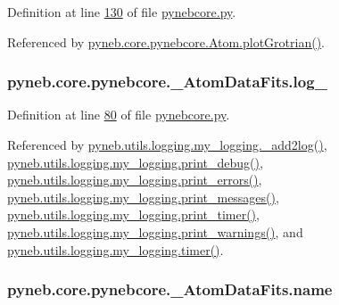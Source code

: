 Definition at line \hyperlink{pynebcore_8py_source_l00130}{130} of file \hyperlink{pynebcore_8py_source}{pynebcore.\+py}.



Referenced by \hyperlink{pynebcore_8py_source_l02372}{pyneb.\+core.\+pynebcore.\+Atom.\+plot\+Grotrian()}.

\hypertarget{classpyneb_1_1core_1_1pynebcore_1_1___atom_data_fits_a8919598e2830080299dcfe70249d4a15}{}
\subsubsection[{log\+\_\+}]{\setlength{\rightskip}{0pt plus 5cm}pyneb.\+core.\+pynebcore.\+\_\+\+Atom\+Data\+Fits.\+log\+\_\+}\label{classpyneb_1_1core_1_1pynebcore_1_1___atom_data_fits_a8919598e2830080299dcfe70249d4a15}


Definition at line \hyperlink{pynebcore_8py_source_l00080}{80} of file \hyperlink{pynebcore_8py_source}{pynebcore.\+py}.



Referenced by \hyperlink{logging_8py_source_l00059}{pyneb.\+utils.\+logging.\+my\+\_\+logging.\+\_\+add2log()}, \hyperlink{logging_8py_source_l00157}{pyneb.\+utils.\+logging.\+my\+\_\+logging.\+print\+\_\+debug()}, \hyperlink{logging_8py_source_l00149}{pyneb.\+utils.\+logging.\+my\+\_\+logging.\+print\+\_\+errors()}, \hyperlink{logging_8py_source_l00133}{pyneb.\+utils.\+logging.\+my\+\_\+logging.\+print\+\_\+messages()}, \hyperlink{logging_8py_source_l00165}{pyneb.\+utils.\+logging.\+my\+\_\+logging.\+print\+\_\+timer()}, \hyperlink{logging_8py_source_l00141}{pyneb.\+utils.\+logging.\+my\+\_\+logging.\+print\+\_\+warnings()}, and \hyperlink{logging_8py_source_l00115}{pyneb.\+utils.\+logging.\+my\+\_\+logging.\+timer()}.

\hypertarget{classpyneb_1_1core_1_1pynebcore_1_1___atom_data_fits_ac3d861a23f94412d8ae28aeb15a98170}{}
\subsubsection[{name}]{\setlength{\rightskip}{0pt plus 5cm}pyneb.\+core.\+pynebcore.\+\_\+\+Atom\+Data\+Fits.\+name}\label{classpyneb_1_1core_1_1pynebcore_1_1___atom_data_fits_ac3d861a23f94412d8ae28aeb15a98170}


